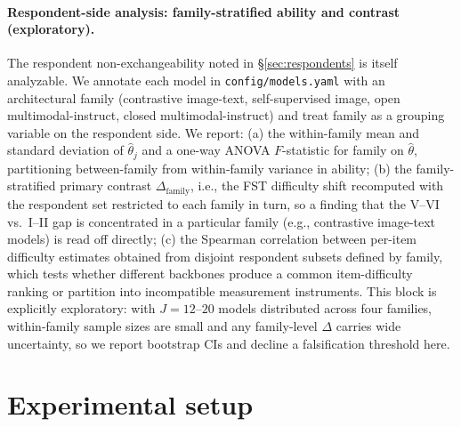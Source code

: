 \documentclass{article}
\begin{document}
\paragraph{Respondent-side analysis: family-stratified ability and contrast (exploratory).}
\label{sec:family}
The respondent non-exchangeability noted in \S\ref{sec:respondents} is itself analyzable. We annotate each model in \texttt{config/models.yaml} with an architectural family (contrastive image-text, self-supervised image, open multimodal-instruct, closed multimodal-instruct) and treat family as a grouping variable on the respondent side. We report: (a) the within-family mean and standard deviation of $\hat\theta_j$ and a one-way ANOVA $F$-statistic for family on $\hat\theta$, partitioning between-family from within-family variance in ability; (b) the family-stratified primary contrast $\Delta_{\text{family}}$, i.e., the FST difficulty shift recomputed with the respondent set restricted to each family in turn, so a finding that the V--VI vs.\ I--II gap is concentrated in a particular family (e.g., contrastive image-text models) is read off directly; (c) the Spearman correlation between per-item difficulty estimates obtained from disjoint respondent subsets defined by family, which tests whether different backbones produce a common item-difficulty ranking or partition into incompatible measurement instruments. This block is explicitly exploratory: with $J = 12$--$20$ models distributed across four families, within-family sample sizes are small and any family-level $\Delta$ carries wide uncertainty, so we report bootstrap CIs and decline a falsification threshold here.

\section{Experimental setup}
\label{sec:experiments}
\end{document}
